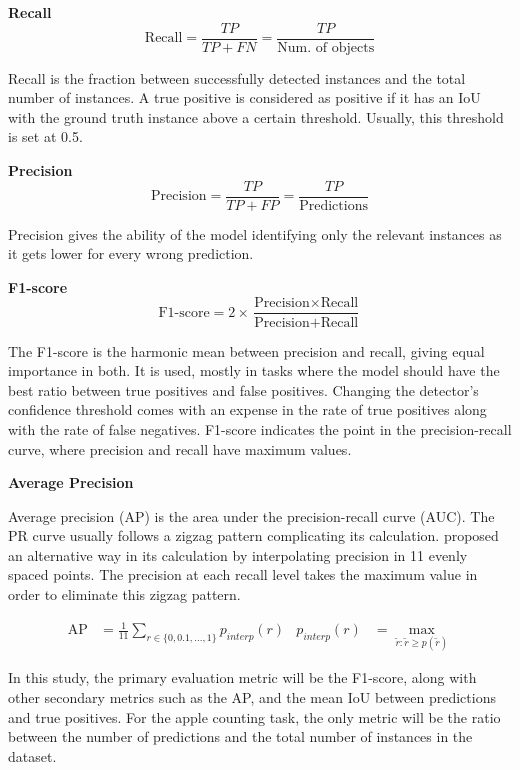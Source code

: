 \bigskip
\textbf{Recall}
\bigskip\noindent
\begin{equation}
  \text{Recall} = \frac{TP}{TP+FN}=\frac{TP}{\text{Num. of objects}}
\end{equation} 

Recall is the fraction between successfully detected instances and the total number of instances. A true positive is considered as positive if it has an IoU with the ground truth instance above a certain threshold. Usually, this threshold is set at 0.5.

\bigskip
\textbf{Precision}
\bigskip\noindent
\begin{equation}
  \text{Precision} = \frac{TP}{TP+FP}=\frac{TP}{\text{Predictions}}
\end{equation} 

Precision gives the ability of the model identifying only the relevant instances as it gets lower for every wrong prediction.

\bigskip
\textbf{F1-score}
\bigskip\noindent
\begin{equation}
  \text{F1-score} = 2\times\frac{\text{Precision}\times \text{Recall}}{\text{Precision}+\text{Recall}}\end{equation} 
  
The F1-score is the harmonic mean between precision and recall, giving equal importance in both. It is used, mostly in tasks where the model should have the best ratio between true positives and false positives. Changing the detector's confidence threshold comes with an expense in the rate of true positives along with the rate of false negatives. F1-score indicates the point in the precision-recall curve, where precision and recall have maximum values.

\bigskip
\textbf{Average Precision}
\bigskip\noindent

Average precision (AP) is the area under the precision-recall curve (AUC). The PR curve usually follows a zigzag pattern complicating its calculation. \cite{everingham2010pascal} proposed an alternative way in its calculation by interpolating precision in 11 evenly spaced points. The precision at each recall level takes the maximum value in order to eliminate this zigzag pattern.

\begin{align}
  \text{AP} &= \frac{1}{11}\sum_{r\in\{0,0.1,...,1\}}p_{interp}(r)	&	p_{interp}(r) &= \max_{\tilde{r}:\tilde{r}\geq p(\tilde{r})}
\end{align} 

In this study, the primary evaluation metric will be the F1-score, along with other secondary metrics such as the AP, and the mean IoU between predictions and true positives. For the apple counting task, the only metric will be the ratio between the number of predictions and the total number of instances in the dataset.